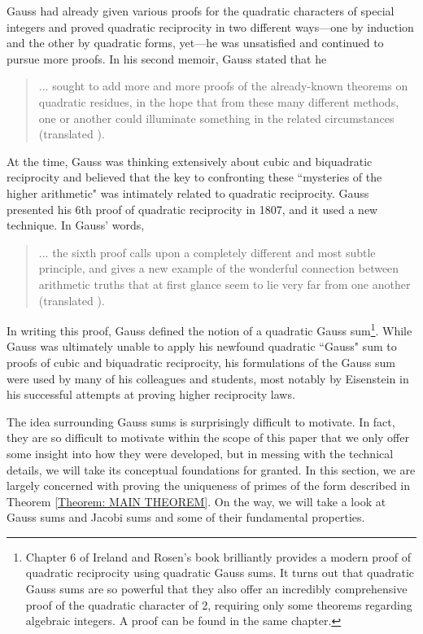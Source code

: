 \documentclass[10pt]{amsart}
\theoremstyle{plain}
\theoremstyle{definition}
\theoremstyle{remark}
\numberwithin{equation}{section}
\begin{document}
\indent Gauss had already given various proofs for the quadratic characters of special integers and proved quadratic reciprocity in two different ways—one by induction and the other by quadratic forms, yet—he was unsatisfied and continued to pursue more proofs. In his second memoir, Gauss stated that he 

\begin{quote}
    ... sought to add more and more proofs of the already-known theorems on quadratic residues, in the hope that from these many different methods, one or another could illuminate something in the related circumstances \cite{biblioteca1863werke2} (translated \cite[pg. 333]{Gray_2018}).
\end{quote}

At the time, Gauss was thinking extensively about cubic and biquadratic reciprocity and believed that the key to confronting these ``mysteries of the higher arithmetic" was intimately related to quadratic reciprocity. Gauss presented his 6th proof of quadratic reciprocity in 1807, and it used a new technique. In Gauss' words, 

\begin{quote}
    ... the sixth proof calls upon a completely different and most subtle principle, and gives a new example of the wonderful connection between arithmetic truths that at first glance seem to lie very far from one another \cite{biblioteca1863werke2} (translated \cite[pg. 333]{Gray_2018}).
\end{quote}

In writing this proof, Gauss defined the notion of a quadratic Gauss sum\footnote{Chapter 6 of Ireland and Rosen's book \cite{ireland1990classical} brilliantly provides a modern proof of quadratic reciprocity using quadratic Gauss sums. It turns out that quadratic Gauss sums are so powerful that they also offer an incredibly comprehensive proof of the quadratic character of 2, requiring only some theorems regarding algebraic integers. A proof can be found in the same chapter.}. While Gauss was ultimately unable to apply his newfound quadratic ``Gauss" sum to proofs of cubic and biquadratic reciprocity, his formulations of the Gauss sum were used by many of his colleagues and students, most notably by Eisenstein in his successful attempts at proving higher reciprocity laws.

\indent The idea surrounding Gauss sums is surprisingly difficult to motivate. In fact, they are so difficult to motivate within the scope of this paper that we only offer some insight into how they were developed, but in messing with the technical details, we will take its conceptual foundations for granted. In this section, we are largely concerned with proving the uniqueness of primes of the form described in Theorem \ref{Theorem: MAIN THEOREM}. On the way, we will take a look at Gauss sums and Jacobi sums and some of their fundamental properties. 
\end{document}
